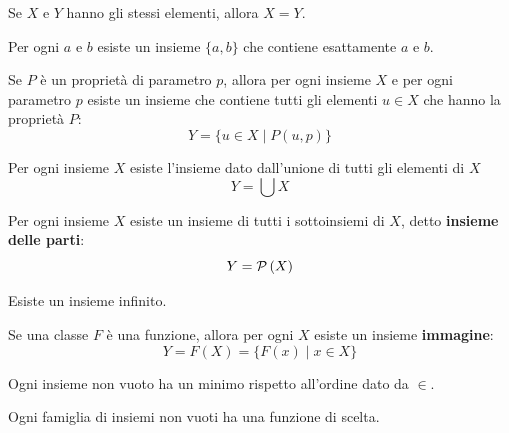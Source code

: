 \begin{axiom}
	 Se $X$ e $Y$ hanno gli stessi elementi, allora $X=Y$.
\end{axiom}
\begin{axiom}
	Per ogni $a$ e $b$ esiste un insieme $\{a,b\}$ che contiene esattamente $a$ e $b$.
\end{axiom}
\begin{axiom}
	Se $P$ è un proprietà di parametro $p$, allora per ogni insieme $X$ e per ogni parametro $p$ esiste un insieme che contiene tutti gli elementi $u\in X$ che hanno la proprietà $P$:
	\begin{equation*}
		Y=\{u\in X\mid P\left(u,p\right)\}
	\end{equation*}
\end{axiom}
\begin{axiom}
	Per ogni insieme $X$ esiste l'insieme dato dall'unione di tutti gli elementi di $X$
	\begin{equation*}
		Y=\bigcup X
	\end{equation*}
\end{axiom}
\begin{axiom}
	Per ogni insieme $X$ esiste un insieme di tutti i sottoinsiemi di $X$, detto \textbf{insieme delle parti}:
	\begin{equation*}
		Y=\mathcal{P}\left(X\right)
	\end{equation*}
\end{axiom}
\begin{axiom}
	Esiste un insieme infinito.
\end{axiom}
\begin{axiom}
	Se una classe $F$ è una funzione, allora per ogni $X$ esiste un insieme \textbf{immagine}:
	\begin{equation*}
		Y=F(X)=\{F(x)\mid x\in X\}
	\end{equation*}
\end{axiom}
\begin{axiom}
	Ogni insieme non vuoto ha un minimo rispetto all'ordine dato da $\in$.
\end{axiom}
\begin{axiom}
	Ogni famiglia di insiemi non vuoti ha una funzione di scelta.
\end{axiom}
